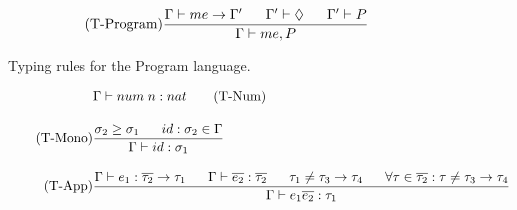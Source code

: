 \begin{figure}[htb]
\begin{align*}
\tag{T-Program}
&\frac
{\Gamma \vdash me \rightarrow \Gamma' \;\;\;\;\;\; \Gamma' \vdash \Diamond \;\;\;\;\;\; \Gamma' \vdash P}
{\Gamma \vdash me, P}
\end{align*}
\caption[Typing Rules: Program Language]{Typing rules for the Program language. \label{fig:TypeRulesProgram}}
\end{figure}

\begin{figure}[htb]
\begin{align*}
&\Gamma \vdash num \; n : nat \tag{T-Num}
\\[1em]
\tag{T-Mono}
&\frac{\sigma_{2} \geq \sigma_{1} \longspace id:\sigma_{2} \in \Gamma}{\Gamma \vdash id:\sigma_{1}}
\\[1em]
\tag{T-App}
&\frac{\Gamma \vdash e_{1}:\overline{\tau_{2}} \rightarrow \tau_{1} \longspace \Gamma \vdash \overline{e_{2}}:\overline{\tau_{2}} \longspace \tau_{1} \neq \tau_{3} \rightarrow \tau_{4} \longspace \forall \tau \in \overline{\tau_{2}} : \tau \neq \tau_{3} \rightarrow \tau_{4}}
{\Gamma \vdash e_{1} \overline{e_{2}}:\tau_{1}}
\\[1em]
%
%

\end{align*}
\end{figure}
